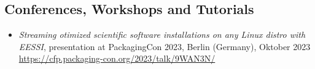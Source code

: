 \subsection*{Conferences, Workshops and Tutorials}

\begin{itemize}

\item[] \emph{Streaming otimized scientific software installations on any Linux distro with EESSI}, presentation at PackagingCon 2023, 
    Berlin (Germany), Oktober 2023 {\small{\url{https://cfp.packaging-con.org/2023/talk/9WAN3N/}}}
\end{itemize}
